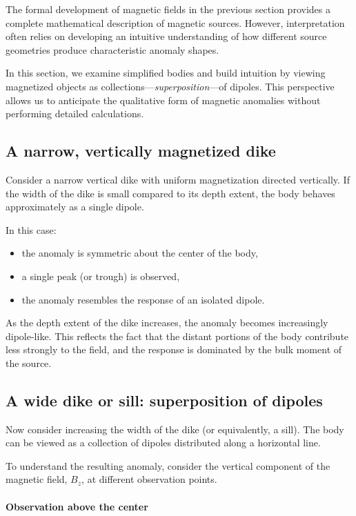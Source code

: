 The formal development of magnetic fields in the previous section provides a complete mathematical description of magnetic sources. However, interpretation often relies on developing an intuitive understanding of how different source geometries produce characteristic anomaly shapes.

In this section, we examine simplified bodies and build intuition by viewing magnetized objects as collections---\emph{superposition}---of dipoles. This perspective allows us to anticipate the qualitative form of magnetic anomalies without performing detailed calculations.

\subsection{A narrow, vertically magnetized dike}

Consider a narrow vertical dike with uniform magnetization directed vertically. If the width of the dike is small compared to its depth extent, the body behaves approximately as a single dipole.

In this case:
\begin{itemize}
    \item the anomaly is symmetric about the center of the body,
    \item a single peak (or trough) is observed,
    \item the anomaly resembles the response of an isolated dipole.
\end{itemize}

As the depth extent of the dike increases, the anomaly becomes increasingly dipole-like. This reflects the fact that the distant portions of the body contribute less strongly to the field, and the response is dominated by the bulk moment of the source.

\subsection{A wide dike or sill: superposition of dipoles}

Now consider increasing the width of the dike (or equivalently, a sill). The body can be viewed as a collection of dipoles distributed along a horizontal line.

To understand the resulting anomaly, consider the vertical component of the magnetic field, $B_z$, at different observation points.

\paragraph{Observation above the center}

